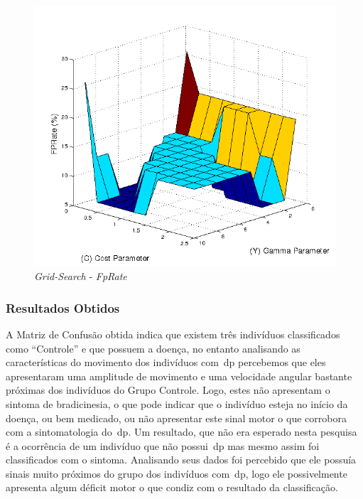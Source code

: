 \begin{figure}[!h]
 \centering
 \includegraphics[scale=0.7]{./img/gridsearchfprate.png}
\caption{\textit{Grid-Search} - \textit{FpRate}}
 \label{fig:gridfprate}
\end{figure}


\subsubsection{Resultados Obtidos}




A Matriz de Confusão obtida indica que existem três indivíduos classificados como ``Controle'' e que possuem a doença, no entanto analisando as características do movimento dos indivíduos com~\ac{dp} percebemos que eles apresentaram uma amplitude de movimento e uma velocidade angular bastante próximas dos indivíduos do Grupo Controle. Logo, estes não apresentam o sintoma de bradicinesia, o que pode indicar que o indivíduo esteja no início da doença, ou bem medicado, ou não apresentar este sinal motor o que corrobora com a sintomatologia do~\ac{dp}. 
Um resultado, que não era esperado nesta pesquisa é a ocorrência de um indivíduo que não possui~\ac{dp} mas mesmo assim foi classificados com o sintoma. Analisando seus dados foi percebido que ele possuía sinais muito próximos do grupo dos indivíduos com~\ac{dp}, logo ele possivelmente apresenta algum déficit motor o que condiz com o resultado da classificação.

